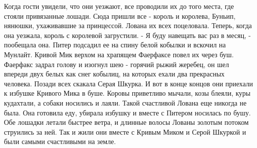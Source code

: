     Когда гости увидели, что они уезжают, все проводили их до того 
места, где стояли привязанные лошади. Сюда пришли все - король и 
королева, Буньип, нянюшки, ухаживавшие за принцессой. Лована их всех 
поцеловала. Теперь, когда она уезжала, король с королевой загрустили.
    - Я буду навещать вас раз в месяц, - пообещала она.
    Питер подсадил ее на спину белой кобылки и вскочил на Мунлайт. 
Кривой Мик верхом на храпящем Фаерфаксе повел их через буш. Фаерфакс 
задрал голову и изогнул шею - горячий рыжий жеребец, он шел впереди 
двух белых как снег кобылиц, на которых ехали два прекрасных человека. 
Позади всех скакала Серая Шкурка.
    И вот в конце концов они приехали к избушке Кривого Мика в буше. 
Коровы приветливо мычали, козы блеяли, куры кудахтали, а собаки 
носились и лаяли. Такой счастливой Лована еще никогда не была.
    Она готовила еду, убирала избушку и вместе с Питером носилась по 
бушу. Обе лошадки летали быстрее ветра, и длинные волосы Лованы 
золотым потоком струились за ней.
    Так и жили они вместе с Кривым Миком и Серой Шкуркой и были самыми 
счастливыми на земле.
